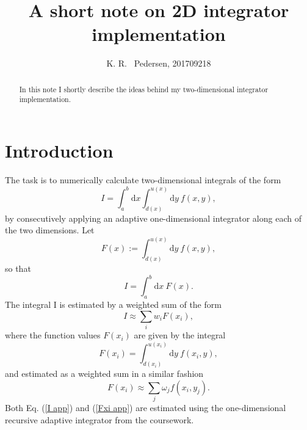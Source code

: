 \documentclass{article}
\title{A short note on 2D integrator implementation}
\author{K. R. ~Pedersen, 201709218}
\date{}
\begin{document}
\lstset{language=C}
\maketitle

\begin{abstract}
In this note I shortly describe the ideas behind my two-dimensional integrator implementation.
\end{abstract}

\section{Introduction}
The task is to numerically calculate two-dimensional integrals of the form
\begin{equation}
	I = \int_a^b {\mathrm d x} \int_{d(x)}^{u(x)} {\mathrm d y} \: f(x,y),
	\label{integral}
\end{equation}
by consecutively applying an adaptive one-dimensional integrator along each of the two dimensions. Let
\begin{equation}
	F(x):= \int_{d(x)}^{u(x)} {\mathrm d y} \: f(x,y),
	\label{define F}
\end{equation}
so that
\begin{equation}
	I=\int_a^b {\mathrm d x} \: F(x).
	\label{I short}
\end{equation}
The integral I is estimated by a weighted sum of the form
\begin{equation}
	I \approx \sum_i w_iF(x_i),
	\label{I app}
\end{equation}
where the function values $F(x_i)$ are given by the integral
\begin{equation}
	F(x_i) = \int_{d(x_i)}^{u(x_i)} {\mathrm d y} \: f(x_i, y),
	\label{Fxi def}
\end{equation}
and estimated as a weighted sum in a similar fashion
\begin{equation}
	F(x_i) \approx \sum_j \omega_j f(x_i, y_j).
	\label{Fxi app}
\end{equation}
Both Eq. (\ref{I app}) and (\ref{Fxi app}) are estimated using the one-dimensional recursive adaptive integrator from the coursework. 
\end{document}
